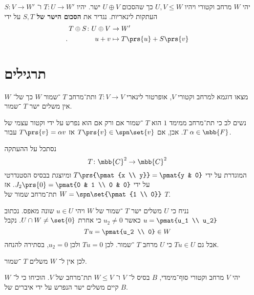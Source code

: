\documentclass[article, 10pt,oneside]{article}
\renewcommand{\emph}[1]{\textbf{#1}}
\begin{document}
\begin{definition}
יהי
$W$
מרחב וקטורי ויהיו
$U,V \leq W$
כך שהסכום
$U \oplus V$
ישר.
יהיו
$T \colon U \to W'$
ו־%
$S \colon V \to W'$
העתקות לינאריות. נגדיר את
\emph{הסכום הישר של
$S,T$}
על ידי
\begin{align*}
T \oplus S \colon U \oplus V &\to W' \\
\text{.} \hspace{4em} u+v &\mapsto T\prs{u} + S\prs{v}
\end{align*}
\end{definition}

\section*{תרגילים}

\begin{exercise}
מצאו דוגמא למרחב וקטורי
$V$,
אופרטור לינארי
$T \colon V \to V$
ותת־מרחב
$T$%
־שמור
$W$
כך של־%
$W$
אין משלים ישר
$T$%
־שמור.
\end{exercise}

\begin{solution}
נשים לב כי תת־מרחב ממימד
$1$
הוא
$T$%
־שמור אם ורק אם הוא נפרש על ידי וקטור עצמי של
$T$.
אכן, אם
$T\prs{v} \in \spn\set{v}$
אז
$T\prs{v} = \alpha v$
עבור
$\alpha \in \mbb{F}$.

נסתכל על ההעתקה
\[T \colon \mbb{C}^2 \to \mbb{C}^2\]
המוגדרת על ידי
$T\prs{\pmat{x \\ y}} = \pmat{y & 0}$
ומיוצגת בבסיס הסטנדרטי על ידי
$J_2\prs{0} = \pmat{0 & 1 \\ 0 & 0}$.
אז
$W = \spn\set{\pmat{1 \\ 0}}$
תת־מרחב שמור של
$T$.

נניח כי
$U$
משלים ישר
$T$%
־שמור של
$W$
ויהי
$u \in U$
שונה מאפס.
נכתוב
$u = \pmat{u_1 \\ u_2}$
כאשר
$u_2 \neq 0$
כי אחרת
$U \cap W \neq \set{0}$.
נקבל
\[Tu = \pmat{u_2 \\ 0} \in W\]
אבל גם
$Tu \in U$
כי
$U$
מרחב
$T$%
־שמור.
לכן
$Tu = 0$
ולכן
$u_2 = 0$,
בסתירה להנחה.

לכן אין ל־%
$W$
משלים
$T$%
־שמור.
\end{solution}

\begin{exercise}
יהי
$V$
מרחב וקטורי סוף־מימדי,
$B$
בסיס ל־%
$V$
ו־%
$W \leq V$
תת־מרחב של
$V$.
הוכיחו כי ל־%
$W$
קיים משלים ישר הנפרש על ידי איברים של
$B$.
\end{exercise}
\end{document}
